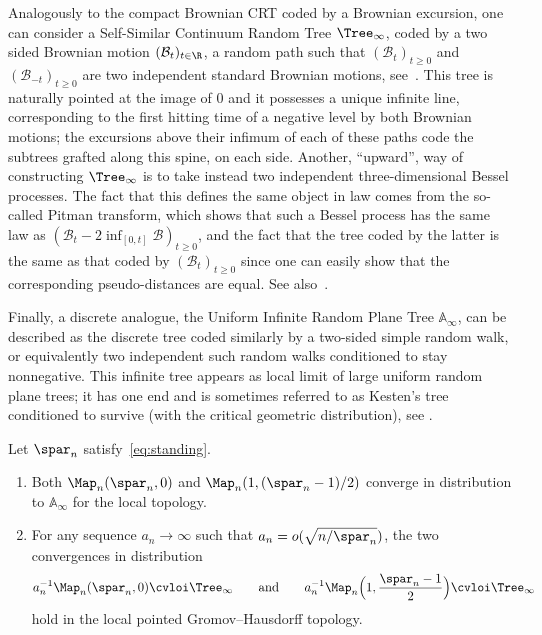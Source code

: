 Analogously to the compact Brownian CRT coded by a Brownian excursion, one can consider a Self-Similar Continuum Random Tree $\Tree_\infty$, coded by a two sided Brownian motion $(\mathcal{B}_t)_{t \in \R}$, \ie a random path such that $(\mathcal{B}_t)_{t \ge 0}$ and $(\mathcal{B}_{-t})_{t \ge 0}$ are two independent standard Brownian motions, see~\cite[\S 2.5]{Ald91c}. This tree is naturally pointed at the image of $0$ and it possesses a unique infinite line, corresponding to the first hitting time of a negative level by both Brownian motions; the excursions above their infimum of each of these paths code the subtrees grafted along this spine, on each side. Another, ``upward'', way of constructing $\Tree_\infty$ is to take instead two independent three-dimensional Bessel processes. The fact that this defines the same object in law comes from the so-called Pitman transform, which shows that such a Bessel process has the same law as $(\mathcal{B}_t - 2\inf_{[0,t]} \mathcal{B})_{t \ge 0}$, and the fact that the tree coded by the latter is the same as that coded by $(\mathcal{B}_t)_{t \ge 0}$ since one can easily show that the corresponding pseudo-distances are equal. See also~\cite[\S 7.7.6]{Pit06}.

Finally, a discrete analogue, the Uniform Infinite Random Plane Tree $\mathbb{A}_\infty$, can be described as the discrete tree coded similarly by a two-sided simple random walk, or equivalently two independent such random walks conditioned to stay nonnegative. This infinite tree appears as local limit of large uniform random plane trees; it has one end and is sometimes referred to as Kesten's tree conditioned to survive (with the critical geometric distribution), see \eg \cite[\S 5]{Jan12}.

\begin{proposition}\label{prop:limites_arbres}
Let $\spar_n$ satisfy~\eqref{eq:standing}.
\begin{enumerate}
\item Both $\Map_{n}(\spar_{n},0)$ and $\Map_{n}(1, (\spar_{n}-1)/2)$ converge in distribution to $\mathbb{A}_\infty$ for the local topology.

\item For any sequence $a_n \to \infty$ such that $a_n = o(\sqrt{n/\spar_n})$, the two convergences in distribution
\[
a_n^{-1} \Map_{n}(\spar_{n},0) \cvloi \Tree_\infty
\qquad \text{and} \qquad
a_n^{-1} \Map_{n}\Bigl(1,\frac{\spar_{n}-1}{2} \Bigr) \cvloi \Tree_\infty
\]
hold in the local pointed Gromov--Hausdorff topology.
\end{enumerate}
\end{proposition}

